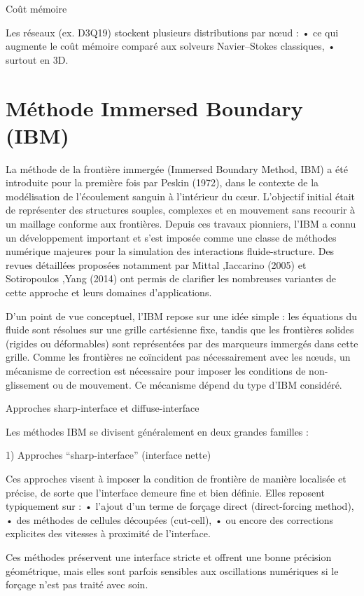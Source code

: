 \documentclass[12pt,a4paper]{report}
\begin{document}
 Coût mémoire

Les réseaux (ex. D3Q19) stockent plusieurs distributions par nœud :
	•	ce qui augmente le coût mémoire comparé aux solveurs Navier–Stokes classiques,
	•	surtout en 3D.


\section{Méthode Immersed Boundary (IBM)}

La méthode de la frontière immergée (Immersed Boundary Method, IBM) a été introduite pour la première fois par Peskin (1972), dans le contexte de la modélisation de l’écoulement sanguin à l’intérieur du cœur. L’objectif initial était de représenter des structures souples, complexes et en mouvement sans recourir à un maillage conforme aux frontières. Depuis ces travaux pionniers, l’IBM a connu un développement important et s’est imposée comme une classe de méthodes numérique majeures pour la simulation des interactions fluide-structure. Des revues détaillées proposées notamment par Mittal ,Iaccarino (2005) et Sotiropoulos ,Yang (2014) ont permis de clarifier les nombreuses variantes de cette approche et leurs domaines d’applications.

D’un point de vue conceptuel, l’IBM repose sur une idée simple : les équations du fluide sont résolues sur une grille cartésienne fixe, tandis que les frontières solides (rigides ou déformables) sont représentées par des marqueurs immergés dans cette grille. Comme les frontières ne coïncident pas nécessairement avec les nœuds, un mécanisme de correction est nécessaire pour imposer les conditions de non-glissement ou de mouvement. Ce mécanisme dépend du type d’IBM considéré.



Approches sharp-interface et diffuse-interface

Les méthodes IBM se divisent généralement en deux grandes familles :

1) Approches “sharp-interface” (interface nette)

Ces approches visent à imposer la condition de frontière de manière localisée et précise, de sorte que l’interface demeure fine et bien définie.
Elles reposent typiquement sur :
	•	l’ajout d’un terme de forçage direct (direct-forcing method),
	•	des méthodes de cellules découpées (cut-cell),
	•	ou encore des corrections explicites des vitesses à proximité de l’interface.

Ces méthodes préservent une interface stricte et offrent une bonne précision géométrique, mais elles sont parfois sensibles aux oscillations numériques si le forçage n’est pas traité avec soin.
\end{document}
